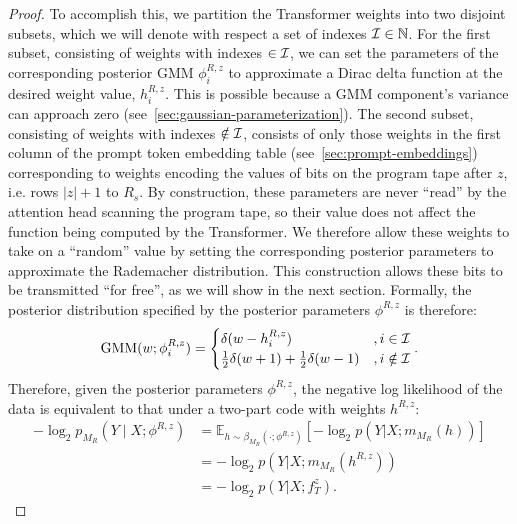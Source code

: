 \begin{proof}
To accomplish this, we partition the Transformer weights into two disjoint subsets, which we will denote with respect a set of indexes ${\mathcal{I}} \in \mathbb{N}$. For the first subset, consisting of weights with indexes $\in {\mathcal{I}}$, we can set the parameters of the corresponding posterior GMM $\phi^{R,z}_i$ to approximate a Dirac delta function at the desired weight value, $h^{R,z}_i$. This is possible because a GMM component's variance can approach zero (see~\ref{sec:gaussian-parameterization}). The second subset, consisting of weights with indexes $\notin {\mathcal{I}}$, consists of only those weights in the first column of the prompt token embedding table (see~\ref{sec:prompt-embeddings}) corresponding to weights encoding the values of bits on the program tape after $z$, i.e. rows $|z| + 1$ to $R_s$. By construction, these parameters are never ``read'' by the attention head scanning the program tape, so their value does not affect the function being computed by the Transformer. We therefore allow these weights to take on a ``random'' value by setting the corresponding posterior parameters to approximate the Rademacher distribution. This construction allows these bits to be transmitted ``for free'', as we will show in the next section. Formally, the posterior distribution specified by the posterior parameters $\phi^{R,z}$ is therefore:
\begin{equation}
    \text{GMM}(w;\phi^{R,z}_i) = 
    \begin{cases} 
    \delta(w - h_i^{R,z}) &, i \in {\mathcal{I}} \\
    \frac{1}{2}\delta(w + 1) + \frac{1}{2}\delta(w - 1) &, i \notin {\mathcal{I}} \\
    \end{cases}.
\end{equation}
Therefore, given the posterior parameters $\phi^{R,z}$, the negative log likelihood of the data is equivalent to that under a two-part code with weights $h^{R,z}$:
\begin{align}
-\log_2 p_{M_R}(Y \mid X; \phi^{R,z}) &= 
\mathbb{E}_{h \sim \beta_{M_R}(\cdot;\phi^{R,z})} \left[ -\log_2 p(Y|X; m_{M_R}(h)) \right] \\
&= -\log_2 p(Y|X; m_{M_R}(h^{R,z})) \\
&= -\log_2 p(Y|X; f_T^z).
\end{align}


\end{proof}
